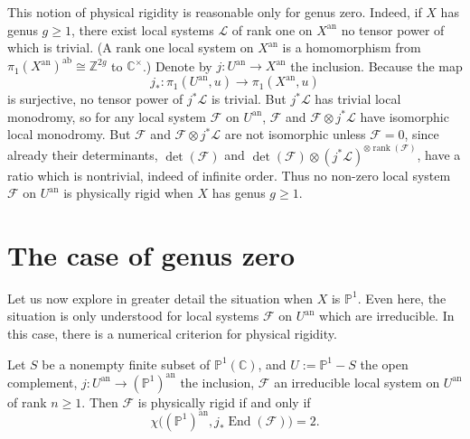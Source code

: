This notion of physical rigidity is reasonable only for genus zero. Indeed, if
\(X\) has genus \(g\geq 1\), there exist local systems \(\mathcal{L}\) of rank
one on \(X^{\mathrm{an}}\) no tensor power of which is trivial. (A rank one
local system on \(X^{\mathrm{an}}\) is a homomorphism from
\(\pi_1(X^{\mathrm{an}})^{\mathrm{ab}}\cong \mathbb{Z}^{2g}\) to
\(\mathbb{C}^{\times}\).) Denote by \(j:U^{\mathrm{an}}\to X^{\mathrm{an}}\)
the inclusion. Because the map
\[
  j_*:\pi_1(U^{\mathrm{an}},u)\to\pi_1(X^{\mathrm{an}},u)
\]
is surjective, no tensor power of \(j^*\mathcal{L}\) is trivial. But
\(j^*\mathcal{L}\) has trivial local monodromy, so for any local system
\(\mathcal{F}\) on \(U^{\mathrm{an}}\), \(\mathcal{F}\) and
\(\mathcal{F}\otimes j^*\mathcal{L}\) have isomorphic local monodromy. But
\(\mathcal{F}\) and \(\mathcal{F}\otimes j^*\mathcal{L}\) are not isomorphic
unless \(\mathcal{F}=0\), since already their determinants,
\(\det(\mathcal{F})\) and
\(\det(\mathcal{F})\otimes(j^*\mathcal{L})^{\otimes\operatorname{rank}(\mathcal{F})}\),
have a ratio which is nontrivial, indeed of infinite order. Thus no non-zero
local system \(\mathcal{F}\) on \(U^{\mathrm{an}}\) is physically rigid when
\(X\) has genus \(g\geq 1\).

\section{The case of genus zero}
\label{sec:1.1}

Let us now explore in greater detail the situation when \(X\) is
\(\mathbb{P}^1\). Even here, the situation is only understood for local systems
\(\mathcal{F}\) on \(U^{\mathrm{an}}\) which are irreducible. In this case,
there is a numerical criterion for physical rigidity.

\setcounter{theorem}{1}
\begin{theorem}
\label{thm:1.1.2}
Let \(S\) be a nonempty finite subset of \(\mathbb{P}^1(\mathbb{C})\), and
\(U:=\mathbb{P}^1-S\) the open complement,
\(j:U^{\mathrm{an}}\to(\mathbb{P}^1)^{\mathrm{an}}\) the inclusion,
\(\mathcal{F}\) an irreducible local system on \(U^{\mathrm{an}}\) of rank
\(n\geq 1\). Then \(\mathcal{F}\) is physically rigid if and only if
\[
  \chi\bigl((\mathbb{P}^1)^{\mathrm{an}},
  j_*\operatorname{End}(\mathcal{F})\bigr)=2.
\]
\end{theorem}

